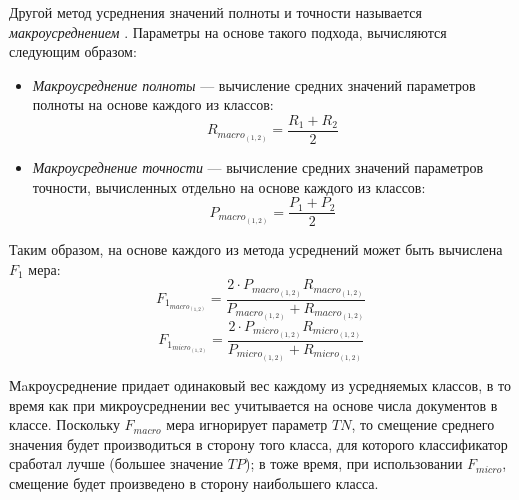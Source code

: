 
    Другой метод усреднения значений полноты и точности называется {\it макроусреднением} \cite{microMacroMeasures}.
    Параметры на основе такого подхода, вычисляются следующим образом:
    \begin{itemize}
        \item {\it Макроусреднение полноты} --- вычисление средних значений параметров
            полноты на основе каждого из классов:
            \begin{equation}
                R_{macro_{(1, 2)}} = \dfrac{R_{1} + R_{2}}{2} \nonumber
            \end{equation}
        \item {\it Макроусреднение точности} --- вычисление средних значений параметров
            точности, вычисленных отдельно на основе каждого из классов:
            \begin{equation}
                P_{macro_{(1, 2)}} = \dfrac{P_{1} + P_{2}}{2} \nonumber
            \end{equation}
    \end{itemize}

    Таким образом, на основе каждого из метода усреднений может быть вычислена
    $F_1$ мера:
    \begin{equation}
        \label{eq:fmacro12}
        F_{1_{macro_{(1,2)}}} = \dfrac{2 \cdot P_{macro_{(1,2)}} R_{macro_{(1,2)}} }{P_{macro_{(1,2)}} + R_{macro_{(1,2)}}}
    \end{equation}
    \begin{equation}
        \label{eq:fmicro12}
        F_{1_{micro_{(1,2)}}} = \dfrac{2 \cdot P_{micro_{(1,2)}} R_{micro_{(1,2)}} }{P_{micro_{(1,2)}} + R_{micro_{(1,2)}}}
    \end{equation}


    Мaкроусреднение придает одинаковый вес каждому из усредняемых классов, в то
    время как при микроусреднении вес учитывается на основе числа документов в
    классе. Поскольку $F_{macro}$ мера игнорирует параметр $TN$, то смещение
    среднего значения будет производиться в сторону того класса, для которого классификатор сработал
    лучше (большее значение $TP$); в тоже время, при использовании $F_{micro}$,
    смещение будет произведено в сторону наибольшего класса. \cite{microMacroMeasures}

